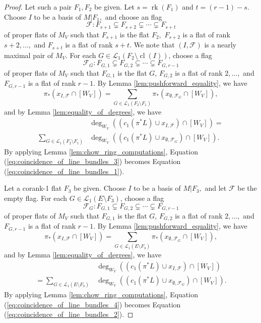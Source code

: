 \documentclass{amsart}
\theoremstyle{plain}
\theoremstyle{definition}
\newcommand{\rk}{\operatorname{rk}}
\newcommand{\cl}{\operatorname{cl}}
\begin{document}
\begin{proof}
Let such a pair $F_1,F_2$ be given.
Let $s = \rk(F_1)$ and $t = (r-1) - s$. Choose $I$ to be a basis of $M | F_1,$ and choose an flag
\[\mathscr{F}:F_{s+1} \subsetneq F_{s+2} \subsetneq \cdots \subsetneq F_{s+t}\]
of proper flats of $M_V$ such that $F_{s+1}$ is the flat $F_2,$ $F_{s+2}$ is a flat of rank $s+2,\ldots,$ and $F_{s+t}$ is a flat of rank $s+t$. We note that $(I, \mathscr{F})$ is a nearly maximal pair of $M_V.$ For each $G \in \mathcal{L}_1(F_2 \setminus \cl(I))$, choose a flag
\[\mathscr{F}_G:F_{G,1} \subsetneq F_{G,2} \subsetneq \cdots \subsetneq F_{G,r-1}\]
of proper flats of $M_V$ such that $F_{G,1}$ is the flat $G$, $F_{G,2}$ is a flat of rank $2,\ldots,$ and $F_{G,r-1}$ is a flat of rank $r-1$. 
By Lemma \ref{lem:pushforward_equality}, we have
\[\pi_*( x_{I, \mathscr{F}} \cap [W_V]) = \sum_{G \in \mathcal{L}_1(F_2 \setminus F_1)}\pi_*( x_{\emptyset, \mathscr{F}_G} \cap[W_V]),\]
and by Lemma \ref{lem:equality_of_degrees}, we have
\begin{equation}
\label{eq:coincidence_of_line_bundles_3}
\begin{split}
& \deg_{W_V}((c_1(\pi^*L) \cup x_{I, \mathscr{F}}) \cap [W_V]) = \\ \sum_{G \in \mathcal{L}_1(F_2 \setminus F_1)} &\deg_{W_V}((c_1(\pi^*L) \cup x_{\emptyset, \mathscr{F}_G}) \cap[W_V]).
\end{split}
\end{equation}
By applying Lemma \ref{lem:chow_ring_computations}, Equation (\ref{eq:coincidence_of_line_bundles_3}) becomes Equation (\ref{eq:coincidence_of_line_bundles_1}). 

Let a corank-1 flat $F_3$ be given. Choose $I$ to be a basis of $M|F_3,$ and let $\mathscr{F}$ be the empty flag. For each $G \in \mathcal{L}_1(E \setminus F_3)$, choose a flag
\[\mathscr{F}_G:F_{G,1} \subsetneq F_{G,2} \subsetneq \cdots \subsetneq F_{G,r-1}\]
of proper flats of $M_V$ such that $F_{G,1}$ is the flat $G$, $F_{G,2}$ is a flat of rank $2,\ldots,$ and $F_{G,r-1}$ is a flat of rank $r-1$.
By Lemma \ref{lem:pushforward_equality}, we have
\[\pi_*( x_{I, \mathscr{F}} \cap [W_V]) = \sum_{G \in \mathcal{L}_1(E \setminus F_3)}\pi_*( x_{\emptyset, \mathscr{F}_G} \cap[W_V]),\]
and by Lemma \ref{lem:equality_of_degrees}, we have
\begin{equation}
\label{eq:coincidence_of_line_bundles_4}
\begin{split}
& \deg_{W_V}((c_1(\pi^*L) \cup x_{I, \mathscr{F}}) \cap [W_V]) \\ = \sum_{G \in \mathcal{L}_1(E \setminus F_3)} & \deg_{W_V}((c_1(\pi^*L) \cup x_{\emptyset, \mathscr{F}_G}) \cap[W_V]).
\end{split}
\end{equation}
By applying Lemma \ref{lem:chow_ring_computations}, Equation (\ref{eq:coincidence_of_line_bundles_4}) becomes Equation (\ref{eq:coincidence_of_line_bundles_2}).
\end{proof}
\end{document}
